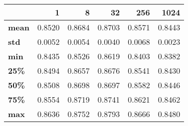 \begin{tabular}{lrrrrr}
\toprule
{} &       1 &       8 &      32 &     256 &    1024 \\
\midrule
\textbf{mean} &  0.8520 &  0.8684 &  0.8703 &  0.8571 &  0.8443 \\
\textbf{std } &  0.0052 &  0.0054 &  0.0040 &  0.0068 &  0.0023 \\
\textbf{min } &  0.8435 &  0.8526 &  0.8619 &  0.8403 &  0.8382 \\
\textbf{25\% } &  0.8494 &  0.8657 &  0.8676 &  0.8541 &  0.8430 \\
\textbf{50\% } &  0.8508 &  0.8698 &  0.8697 &  0.8582 &  0.8446 \\
\textbf{75\% } &  0.8554 &  0.8719 &  0.8741 &  0.8621 &  0.8462 \\
\textbf{max } &  0.8636 &  0.8752 &  0.8793 &  0.8666 &  0.8480 \\
\bottomrule
\end{tabular}
